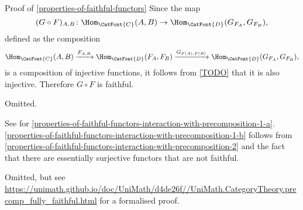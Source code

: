 \begin{Proof}{Proof of \cref{properties-of-faithful-functors}}%
    Since the map
    \[
        (G\circ F)_{A,B}
        \colon
        \Hom_{\CatFont{C}}(A,B)
        \to
        \Hom_{\CatFont{D}}(G_{F_{A}},G_{F_{B}}),%
    \]%
    defined as the composition
    \[
        \Hom_{\CatFont{C}}(A,B)%
        \xrightarrow{F_{A,B}}%
        \Hom_{\CatFont{D}}(F_{A},F_{B})%
        \xrightarrow{G_{F(A),F(B)}}%
        \Hom_{\CatFont{D}}(G_{F_{A}},G_{F_{B}}),%
    \]%
    is a composition of injective functions, it follows from \cref{TODO} that it is also injective. Therefore $G\circ F$ is faithful.

    Omitted.

    See \cite{MSE733163} for \cref{properties-of-faithful-functors-interaction-with-precomposition-1-a}. \cref{properties-of-faithful-functors-interaction-with-precomposition-1-b} follows from \cref{properties-of-faithful-functors-interaction-with-precomposition-2} and the fact that there are essentially surjective functors that are not faithful.

    Omitted, but see \url{https://unimath.github.io/doc/UniMath/d4de26f//UniMath.CategoryTheory.precomp\_fully\_faithful.html} for a formalised proof.


\end{Proof}
